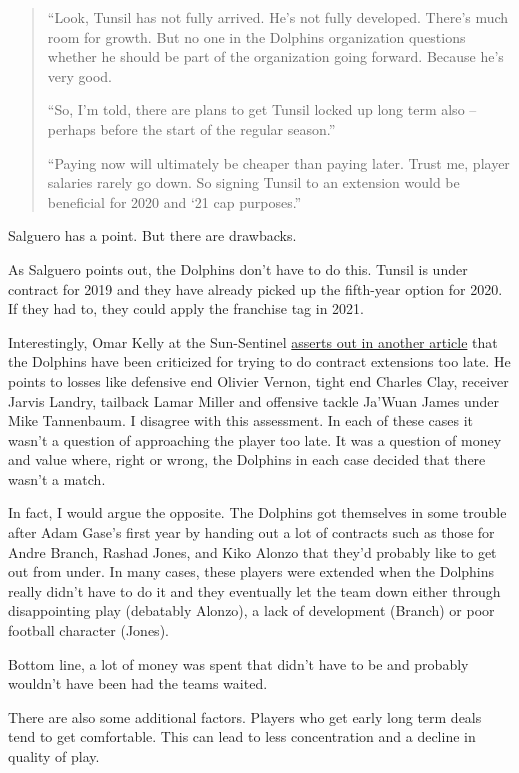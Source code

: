 \documentclass[11pt]{article}
\begin{document}
\begin{itemize}
\begin{quote}
``Look, Tunsil has not fully arrived. He’s not fully developed. There’s much room for growth. But no one in the Dolphins organization questions whether he should be part of the organization going forward. Because he’s very good.

``So, I’m told, there are plans to get Tunsil locked up long term also -- perhaps before the start of the regular season.''

``Paying now will ultimately be cheaper than paying later. Trust me, player salaries rarely go down. So signing Tunsil to an extension would be beneficial for 2020 and ‘21 cap purposes.''
\end{quote}

Salguero has a point.  But there are drawbacks.

As Salguero points out, the Dolphins don’t have to do this. Tunsil is under contract for 2019 and they have already picked up the fifth-year option for 2020.  If they had to, they could apply the franchise tag in 2021.

Interestingly, Omar Kelly at the Sun-Sentinel \href{https://www.sun-sentinel.com/sports/miami-dolphins/fl-sp-dolphins-xavien-howard-20190510-nmebckxrcnfnpfp2pamje77aeu-story.html}{asserts out in another article} that the Dolphins have been criticized for trying to do contract extensions too late.  He points to losses like defensive end Olivier Vernon, tight end Charles Clay, receiver Jarvis Landry, tailback Lamar Miller and offensive tackle Ja’Wuan James under Mike Tannenbaum.  I disagree with this assessment.  In each of these cases it wasn't a question of approaching the player too late.  It was a question of money and value where, right or wrong, the Dolphins in each case decided that there wasn't a match.

In fact, I would argue the opposite.  The Dolphins got themselves in some trouble after Adam Gase's first year by handing out a lot of contracts such as those for Andre Branch, Rashad Jones, and Kiko Alonzo that they'd probably like to get out from under.  In many cases, these players were extended when the Dolphins really didn't have to do it and they eventually let the team down either through disappointing play (debatably Alonzo), a lack of development (Branch) or poor football character (Jones).

Bottom line, a lot of money was spent that didn't have to be and probably wouldn't have been had the teams waited.

There are also some additional factors.  Players who get early long term deals tend to get comfortable.  This can lead to less concentration and a decline in quality of play.


\end{itemize}
\end{document}
